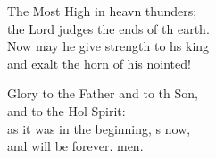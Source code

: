 \begin{psalmverse}
\begin{patverse}
The Most High in heavn thunders;\Med\\
the Lord judges the ends of th earth.\\
Now may he give strength to h\pointup{\i}s king\Med\\
and exalt the horn of his nointed!

Glory to the Father and to th Son,\Med\\
and to the Hol Spirit:\\
as it was in the beginning, \pointup{\i}s now,\Med\\
and will be forever. men.
  \end{patverse}
\end{psalmverse}
